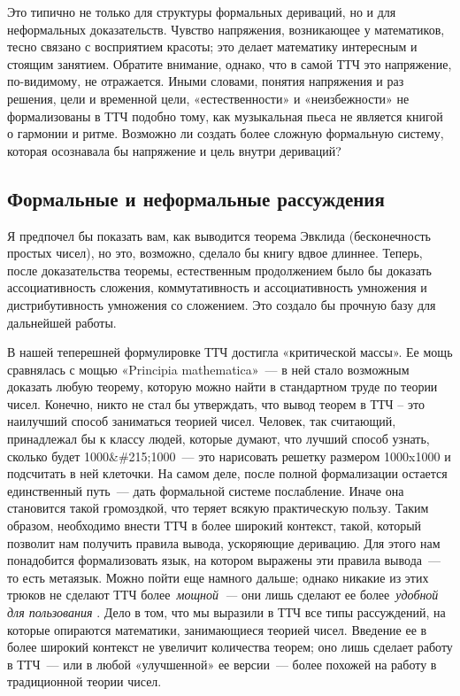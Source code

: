 \documentclass[../main.tex]{subfiles}
\begin{document}
Это типично не только для структуры формальных дериваций, но и для неформальных доказательств. Чувство напряжения, возникающее у математиков, тесно связано с восприятием красоты; это делает математику интересным и стоящим занятием. Обратите внимание, однако, что в самой ТТЧ это напряжение, по-видимому, не отражается. Иными словами, понятия напряжения и раз решения, цели и временной цели, «естественности» и «неизбежности» не формализованы в ТТЧ подобно тому, как музыкальная пьеса не является книгой о гармонии и ритме. Возможно ли создать более сложную формальную систему, которая осознавала бы напряжение и цель внутри дериваций?


\subsection{Формальные и неформальные рассуждения}

Я предпочел бы показать вам, как выводится теорема Эвклида (бесконечность простых чисел), но это, возможно, сделало бы книгу вдвое длиннее. Теперь, после доказательства теоремы, естественным продолжением было бы доказать ассоциативность сложения, коммутативность и ассоциативность умножения и дистрибутивность умножения со сложением. Это создало бы прочную базу для дальнейшей работы.

В нашей теперешней формулировке ТТЧ достигла «критической массы». Ее мощь сравнялась с мощью «Principia mathematica»~--- в ней стало возможным доказать любую теорему, которую можно найти в стандартном труде по теории чисел. Конечно, никто не стал бы утверждать, что вывод теорем в ТТЧ \--- это наилучший способ заниматься теорией чисел. Человек, так считающий, принадлежал бы к классу людей, которые думают, что лучший способ узнать, сколько будет 1000\&\#215;1000~--- это нарисовать решетку размером 1000x1000 и подсчитать в ней клеточки. На самом деле, после полной формализации остается единственный путь~--- дать формальной системе послабление. Иначе она становится такой громоздкой, что теряет всякую практическую пользу. Таким образом, необходимо внести ТТЧ в более широкий контекст, такой, который позволит нам получить правила вывода, ускоряющие деривацию. Для этого нам понадобится формализовать язык, на котором выражены эти правила вывода~--- то есть метаязык. Можно пойти еще намного дальше; однако никакие из этих трюков не сделают ТТЧ более~\emph{мощной~---} они лишь сделают ее более~\emph{удобной для пользования} . Дело в том, что мы выразили в ТТЧ все типы рассуждений, на которые опираются математики, занимающиеся теорией чисел. Введение ее в более широкий контекст не увеличит количества теорем; оно лишь сделает работу в ТТЧ~--- или в любой «улучшенной» ее версии~--- более похожей на работу в традиционной теории чисел.
\end{document}
